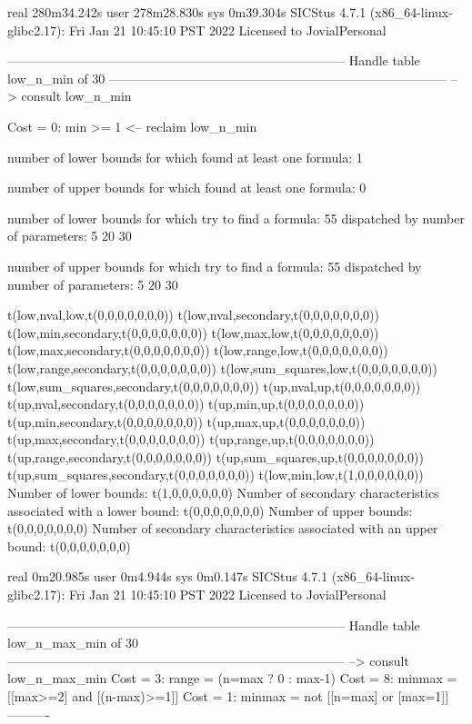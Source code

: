 real	280m34.242s
user	278m28.830s
sys	0m39.304s
SICStus 4.7.1 (x86_64-linux-glibc2.17): Fri Jan 21 10:45:10 PST 2022
Licensed to JovialPersonal


--------------------------------------------------------------------------------
Handle table low_n_min of 30
--------------------------------------------------------------------------------
--> consult low_n_min

Cost =  0:  min >= 1
<-- reclaim low_n_min

number of lower bounds for which found at least one formula: 1

number of upper bounds for which found at least one formula: 0

number of lower bounds for which try to find a formula: 55
dispatched by number of parameters: 5  20  30

number of upper bounds for which try to find a formula: 55
dispatched by number of parameters: 5  20  30

t(low,nval,low,t(0,0,0,0,0,0,0))
t(low,nval,secondary,t(0,0,0,0,0,0,0))
t(low,min,secondary,t(0,0,0,0,0,0,0))
t(low,max,low,t(0,0,0,0,0,0,0))
t(low,max,secondary,t(0,0,0,0,0,0,0))
t(low,range,low,t(0,0,0,0,0,0,0))
t(low,range,secondary,t(0,0,0,0,0,0,0))
t(low,sum_squares,low,t(0,0,0,0,0,0,0))
t(low,sum_squares,secondary,t(0,0,0,0,0,0,0))
t(up,nval,up,t(0,0,0,0,0,0,0))
t(up,nval,secondary,t(0,0,0,0,0,0,0))
t(up,min,up,t(0,0,0,0,0,0,0))
t(up,min,secondary,t(0,0,0,0,0,0,0))
t(up,max,up,t(0,0,0,0,0,0,0))
t(up,max,secondary,t(0,0,0,0,0,0,0))
t(up,range,up,t(0,0,0,0,0,0,0))
t(up,range,secondary,t(0,0,0,0,0,0,0))
t(up,sum_squares,up,t(0,0,0,0,0,0,0))
t(up,sum_squares,secondary,t(0,0,0,0,0,0,0))
t(low,min,low,t(1,0,0,0,0,0,0))
Number of lower bounds:                                             t(1,0,0,0,0,0,0)
Number of secondary characteristics associated with a lower bound:  t(0,0,0,0,0,0,0)
Number of upper bounds:                                             t(0,0,0,0,0,0,0)
Number of secondary characteristics associated with an upper bound: t(0,0,0,0,0,0,0)

real	0m20.985s
user	0m4.944s
sys	0m0.147s
SICStus 4.7.1 (x86_64-linux-glibc2.17): Fri Jan 21 10:45:10 PST 2022
Licensed to JovialPersonal


--------------------------------------------------------------------------------
Handle table low_n_max_min of 30
--------------------------------------------------------------------------------
--> consult low_n_max_min
Cost =  3:  range  = (n=max ? 0 : max-1)
Cost =  8:  minmax = [[max>=2] and [(n-max)>=1]]
Cost =  1:  minmax = not [[n=max] or [max=1]]
----------

